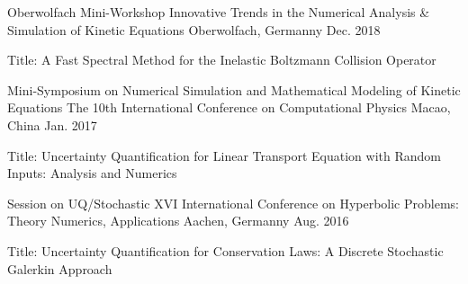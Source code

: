 

\begin{cventries}

  \cventry
    {Oberwolfach Mini-Workshop} %
    {Innovative Trends in the Numerical Analysis \& Simulation of Kinetic Equations} %
    {Oberwolfach, Germanny} %
    {Dec. 2018} %
    {
      \begin{cvitems} %
        \item {Title: A Fast Spectral Method for the Inelastic Boltzmann Collision Operator}
      \end{cvitems}
    }

  \cventry
    {Mini-Symposium on Numerical Simulation and Mathematical Modeling of Kinetic Equations} %
    {The 10th International Conference on Computational Physics} %
    {Macao, China} %
    {Jan. 2017} %
    {
      \begin{cvitems} %
        \item {Title: Uncertainty Quantification for Linear Transport Equation with Random Inputs: Analysis and Numerics}
      \end{cvitems}
    }

  \cventry
    {Session on UQ/Stochastic} %
    {XVI International Conference on Hyperbolic Problems: Theory Numerics, Applications} %
    {Aachen, Germanny} %
    {Aug. 2016} %
    {
      \begin{cvitems} %
        \item {Title: Uncertainty Quantification for Conservation Laws: A Discrete Stochastic Galerkin Approach}
      \end{cvitems}
    }

\end{cventries}
